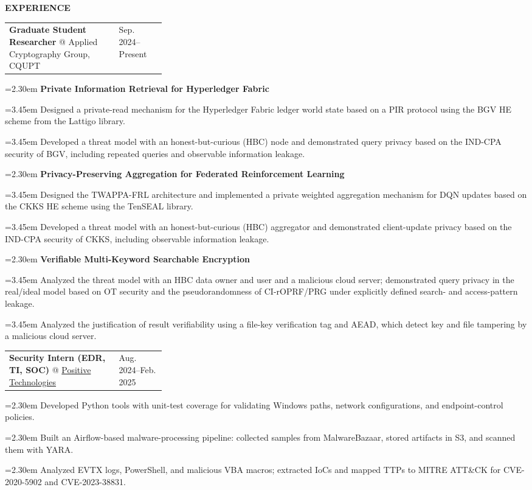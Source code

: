 \documentclass[11pt,a4paper]{article}
\makeatletter
\newcommand{\cvrow}[2]{%
  \noindent
  \begin{minipage}[t]{0.145\textwidth}
    \vspace{0pt}%
    \raggedright
    \fontsize{8.5}{10}\selectfont
    \bfseries\MakeUppercase{#1}
  \end{minipage}%
  \hfill
  \begin{minipage}[t]{0.835\textwidth}
    \vspace{0pt}%
    #2
  \end{minipage}\par
}
\newcommand{\workentry}[2]{%
  \noindent
  \begin{tabularx}{\linewidth}
    {@{}X@{\hspace{0.8em}}
    >{\raggedleft\arraybackslash}p{0.30\linewidth}@{}}
    #1 & \small #2
  \end{tabularx}\par
  \vspace{0.15em}
}
\newcommand{\workproject}[1]{%
  \noindent
  \hangindent=2.30em
  \hangafter=1
  \hspace*{1.15em}\makebox[1.15em][l]{$\diamond$}#1\par
  \vspace{0.12em}
}
\newcommand{\workprojectdetail}[1]{%
  \noindent
  \hangindent=3.45em
  \hangafter=1
  \hspace*{2.30em}\makebox[1.15em][l]{--}#1\par
  \vspace{0.08em}
}
\makeatother
\begin{document}
\vspace{0.50em}

\cvrow{Experience}{%
  \workentry
    {\textbf{Graduate Student Researcher} @ Applied Cryptography Group, CQUPT}
    {Sep. 2024--Present}

  \workproject{\textbf{Private Information Retrieval for Hyperledger Fabric}}
  \workprojectdetail{Designed a private-read mechanism for the Hyperledger Fabric
  ledger world state based on a PIR protocol using the BGV HE scheme from the
  Lattigo library.}
  \workprojectdetail{Developed a threat model with an honest-but-curious (HBC) node
  and demonstrated query privacy based on the IND-CPA security of BGV, including
  repeated queries and observable information leakage.}

  \workproject{\textbf{Privacy-Preserving Aggregation for Federated Reinforcement Learning}}
  \workprojectdetail{Designed the TWAPPA-FRL architecture and implemented a private
  weighted aggregation mechanism for DQN updates based on the CKKS HE scheme using
  the TenSEAL library.}
  \workprojectdetail{Developed a threat model with an honest-but-curious (HBC)
  aggregator and demonstrated client-update privacy based on the IND-CPA security
  of CKKS, including observable information leakage.}

  \workproject{\textbf{Verifiable Multi-Keyword Searchable Encryption}}
  \workprojectdetail{Analyzed the threat model with an HBC data owner and user and
  a malicious cloud server; demonstrated query privacy in the real/ideal model
  based on OT security and the pseudorandomness of CI-rOPRF/PRG under explicitly
  defined search- and access-pattern leakage.}
  \workprojectdetail{Analyzed the justification of result verifiability using a
  file-key verification tag and AEAD, which detect key and file tampering by a
  malicious cloud server.}
}

\vspace{0.50em}

\cvrow{}{%
  \workentry
    {\textbf{Security Intern (EDR, TI, SOC)} @
    \href{https://global.ptsecurity.com/en/}{Positive Technologies}}
    {Aug. 2024--Feb. 2025}

  \workproject{Developed Python tools with unit-test coverage for validating
  Windows paths, network configurations, and endpoint-control policies.}
  \workproject{Built an Airflow-based malware-processing pipeline: collected
  samples from MalwareBazaar, stored artifacts in S3, and scanned them with YARA.}
  \workproject{Analyzed EVTX logs, PowerShell, and malicious VBA macros; extracted
  IoCs and mapped TTPs to MITRE ATT\&CK for CVE-2020-5902 and CVE-2023-38831.}
}
\end{document}
